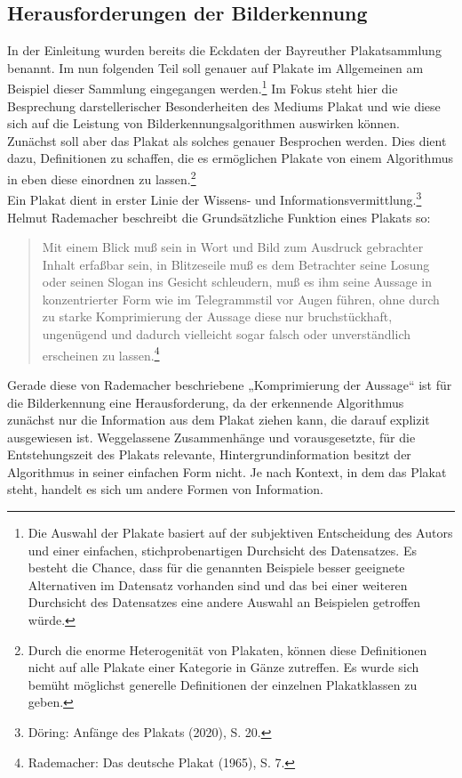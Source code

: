 \documentclass[a4paper,12pt,ngerman]{article}
\begin{document}
\subsection{Herausforderungen der Bilderkennung}
In der Einleitung wurden bereits die Eckdaten der Bayreuther Plakatsammlung benannt. Im nun folgenden Teil soll genauer auf Plakate im Allgemeinen am Beispiel dieser Sammlung eingegangen werden.\footnote{Die Auswahl der Plakate basiert auf der subjektiven Entscheidung des Autors und einer einfachen, stichprobenartigen Durchsicht des Datensatzes. Es besteht die Chance, dass für die genannten Beispiele besser geeignete Alternativen im Datensatz vorhanden sind und das bei einer weiteren Durchsicht des Datensatzes eine andere Auswahl an Beispielen getroffen würde.} Im Fokus steht hier die Besprechung darstellerischer Besonderheiten des Mediums Plakat und wie diese sich auf die Leistung von Bilderkennungsalgorithmen auswirken können. \\
Zunächst soll aber das Plakat als solches genauer Besprochen werden. Dies dient dazu, Definitionen zu schaffen, die es ermöglichen Plakate von einem Algorithmus in eben diese einordnen zu lassen.\footnote{Durch die enorme Heterogenität von Plakaten, können diese Definitionen nicht auf alle Plakate einer Kategorie in Gänze zutreffen. Es wurde sich bemüht möglichst generelle Definitionen der einzelnen Plakatklassen zu geben.} \\ 
Ein Plakat dient in erster Linie der Wissens- und Informationsvermittlung.\footnote{Döring: Anfänge des Plakats (2020), S. 20.}  Helmut Rademacher beschreibt die Grundsätzliche Funktion eines Plakats so:

\blockquote{\fontsize{10pt}{12pt} \selectfont Mit einem Blick muß sein in Wort und Bild zum Ausdruck gebrachter Inhalt erfaßbar sein, in Blitzeseile muß es dem Betrachter seine Losung oder seinen Slogan ins Gesicht schleudern, muß es ihm seine Aussage in konzentrierter Form wie im Telegrammstil vor Augen führen, ohne durch zu starke Komprimierung der Aussage diese nur bruchstückhaft, ungenügend und dadurch vielleicht sogar falsch oder unverständlich erscheinen zu lassen.\footnote{Rademacher: Das deutsche Plakat (1965), S. 7.}}

Gerade diese von Rademacher beschriebene „Komprimierung der Aussage“ ist für die Bilderkennung eine Herausforderung, da der erkennende Algorithmus zunächst nur die Information aus dem Plakat ziehen kann, die darauf explizit ausgewiesen ist. Weggelassene Zusammenhänge und vorausgesetzte, für die Entstehungszeit des Plakats relevante, Hintergrundinformation besitzt der Algorithmus in seiner einfachen Form nicht.
Je nach Kontext, in dem das Plakat steht, handelt es sich um andere Formen von Information. \\
\end{document}
